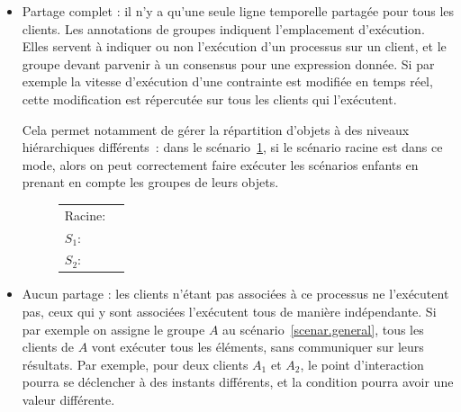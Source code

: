 \documentclass{article}
\newcommand\trigger{point d'interaction\xspace}
\begin{document}
\begin{itemize}
    \item Partage complet : il n'y a qu'une seule ligne temporelle partagée pour tous les clients. 
    Les annotations de groupes indiquent l'emplacement d'exécution. 
    Elles servent à indiquer ou non l'exécution d'un processus sur un client, et le groupe devant parvenir à un consensus pour une expression donnée. 
    Si par exemple la vitesse d'exécution d'une contrainte est modifiée en temps réel, cette modification est répercutée sur tous les clients qui l'exécutent.
    
    Cela permet notamment de gérer la répartition d'objets à des niveaux hiérarchiques différents~: dans le scénario~\ref{scenar.hierarchy}, si le scénario racine est dans ce mode, alors on peut correctement faire exécuter les scénarios enfants en prenant en compte les groupes de leurs objets. 
    
    \begin{figure}[h]
        \centering
        \begin{tabular}{L{3.5em}R{0.3\textwidth}}
            Racine: & \begin{tikzpicture}
            
            \end{tikzpicture} \\
            $S_1$: & \begin{tikzpicture}[scale=0.4, every node/.style={scale=0.6}]
            
            \end{tikzpicture} \\
            $S_2$: & \begin{tikzpicture}[scale=0.6, every node/.style={scale=0.6}]
            
            \end{tikzpicture} \\
        \end{tabular}
        \label{scenar.hierarchy}
    \end{figure}
    
    \item Aucun partage : les clients n'étant pas associées à ce processus ne l'exécutent pas, ceux qui y sont associées l'exécutent tous de manière indépendante.
    Si par exemple on assigne le groupe $A$ au scénario~\ref{scenar.general}, tous les clients de $A$ vont exécuter tous les éléments, sans communiquer sur leurs résultats. 
    Par exemple, pour deux clients $A_1$ et $A_2$, le \trigger pourra se déclencher à des instants différents, et la condition pourra avoir une valeur différente.
    

\end{itemize}
\end{document}
